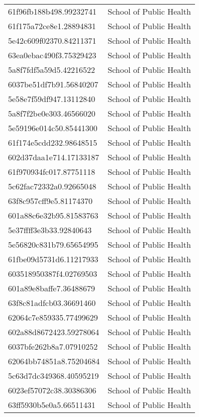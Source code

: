 \begin{tabular}{ll}
61f96fb188b498.99232741 & School of Public Health \\
61f175a72ce8e1.28894831 & School of Public Health \\
5e42c609f02370.84211371 & School of Public Health \\
63ea0ebac490f3.75329423 & School of Public Health \\
5a8f7fdf5a59d5.42216522 & School of Public Health \\
6037be51df7b91.56840207 & School of Public Health \\
5e58e7f59df947.13112840 & School of Public Health \\
5a8f7f2be0e303.46566020 & School of Public Health \\
5e59196e014c50.85441300 & School of Public Health \\
61f174e5cdd232.98648515 & School of Public Health \\
602d37daa1e714.17133187 & School of Public Health \\
61f970934fc017.87751118 & School of Public Health \\
5c62fac72332a0.92665048 & School of Public Health \\
63f8c957cff9e5.81174370 & School of Public Health \\
601a88c6e32b95.81583763 & School of Public Health \\
5e37ffff3e3b33.92840643 & School of Public Health \\
5e56820c831b79.65654995 & School of Public Health \\
61fbe09d5731d6.11217933 & School of Public Health \\
603518950387f4.02769503 & School of Public Health \\
601a89e8baffe7.36488679 & School of Public Health \\
63f8c81adfcb03.36691460 & School of Public Health \\
62064c7e859335.77499629 & School of Public Health \\
602a88d8672423.59278064 & School of Public Health \\
6037bfe262b8a7.07910252 & School of Public Health \\
62064bb74851a8.75204684 & School of Public Health \\
5c63d7dc349368.40595219 & School of Public Health \\
6023ef57072c38.30386306 & School of Public Health \\
63ff5930b5e0a5.66511431 & School of Public Health \\

\end{tabular}
